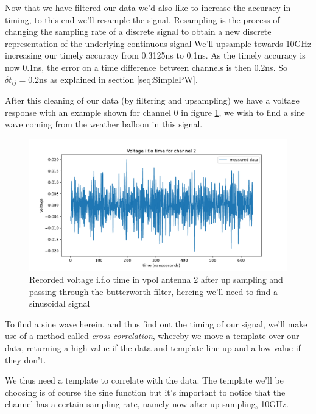Now that we have filtered our data we'd also like to increase the accuracy in
timing, to this end we'll resample the signal. Resampling is the process of
changing the sampling rate of a discrete signal to obtain a new discrete
representation of the underlying continuous signal We'll upsample towards 10GHz
increasing our timely accuracy from 0.3125ns to 0.1ns.  As the timely accuracy
is now 0.1ns, the error on a time difference between channels is then 0.2ns. So
$\delta t_{ij}=0.2$ns as explained in section \ref{seq:SimplePW}.

After this cleaning of
our data (by filtering and upsampling) we have a voltage response with an example 
shown for channel 0 in figure \ref{fig:VoltageAfterFilter}, we wish to find a sine
wave coming from the weather balloon in this signal.
\begin{figure}
	\centering
	\includegraphics[width=\textwidth]{figures/VoltageAfterFilter.pdf}
	\caption{Recorded voltage i.f.o time in vpol antenna 2 after up sampling and passing through the butterworth filter, hereing we'll need to find a sinusoidal signal}
	\label{fig:VoltageAfterFilter}
\end{figure}
To find a sine wave herein, and thus find out the timing of our signal, we'll
make use of a method called \textit{cross correlation}, whereby we move a
template over our data, returning a high value if the data and template line up
and a low value if they don't.

We thus need a template to correlate with the data. The template we'll be choosing is
of course the sine function but it's important to notice that the channel has a
certain sampling rate, namely now after up sampling, 10GHz. 

